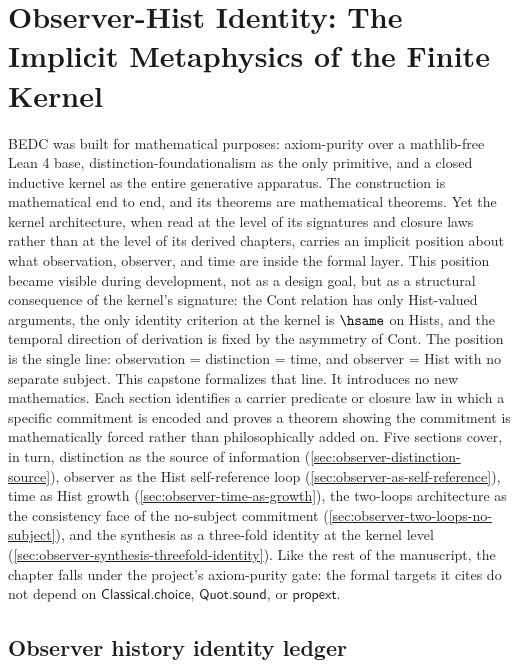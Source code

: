 \chapter{Observer-Hist Identity: The Implicit Metaphysics of the Finite Kernel}
\label{ch:capstones-observer-hist-identity}

BEDC was built for mathematical purposes: axiom-purity over a mathlib-free Lean 4 base, distinction-foundationalism as the only primitive, and a closed inductive kernel as the entire generative apparatus. The construction is mathematical end to end, and its theorems are mathematical theorems. Yet the kernel architecture, when read at the level of its signatures and closure laws rather than at the level of its derived chapters, carries an implicit position about what observation, observer, and time are inside the formal layer. This position became visible during development, not as a design goal, but as a structural consequence of the kernel's signature: the Cont relation has only Hist-valued arguments, the only identity criterion at the kernel is \(\hsame\) on Hists, and the temporal direction of derivation is fixed by the asymmetry of Cont. The position is the single line: observation = distinction = time, and observer = Hist with no separate subject. This capstone formalizes that line. It introduces no new mathematics. Each section identifies a carrier predicate or closure law in which a specific commitment is encoded and proves a theorem showing the commitment is mathematically forced rather than philosophically added on. Five sections cover, in turn, distinction as the source of information (\autoref{sec:observer-distinction-source}), observer as the Hist self-reference loop (\autoref{sec:observer-as-self-reference}), time as Hist growth (\autoref{sec:observer-time-as-growth}), the two-loops architecture as the consistency face of the no-subject commitment (\autoref{sec:observer-two-loops-no-subject}), and the synthesis as a three-fold identity at the kernel level (\autoref{sec:observer-synthesis-threefold-identity}). Like the rest of the manuscript, the chapter falls under the project's axiom-purity gate: the formal targets it cites do not depend on \(\mathsf{Classical.choice}\), \(\mathsf{Quot.sound}\), or \(\mathsf{propext}\).

\section{Observer history identity ledger}
\label{sec:observer-history-identity-ledger}

